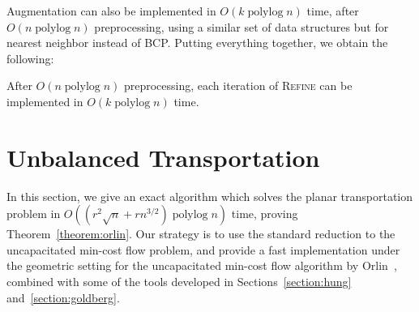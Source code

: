 \documentclass[a4paper,UKenglish]{socg-lipics-v2018}
\def\polylog{\mathop{\mathrm{polylog}}}
\def\norm#1{\mathopen\| #1 \mathclose\|}	%
\def\tsupply{\lambda}
\def\fsupply{\phi}
\def\arcto{\mathord\shortrightarrow}
\def\arc#1#2{#1\arcto#2}
\def\cost{\operatorname{cost}}
\theoremstyle{plain}
\numberwithin{figure}{section}
\begin{document}
Augmentation can also be implemented in $O(k\polylog n)$ time, after
$O(n\polylog n)$ preprocessing, using a similar set of data structures but
for nearest neighbor instead of BCP.
Putting everything together, we obtain the following:

\begin{lemma}
\label{lemma:refine_iter_time}
After $O(n\polylog n)$ preprocessing, each iteration of \textsc{Refine} can be
implemented in $O(k\polylog n)$ time.
\end{lemma}


\section{Unbalanced Transportation}
\label{section:orlin}

In this section, we give an exact algorithm which solves the planar transportation
problem in $O((r^2\sqrt{n} + rn^{3/2})\polylog n)$ time, proving Theorem~\ref{theorem:orlin}.
Our strategy is to use the standard reduction to the uncapacitated
min-cost flow problem, and provide a fast implementation under the geometric setting for the uncapacitated min-cost flow algorithm by Orlin~\cite{O93}, combined with some of the tools developed in Sections~\ref{section:hung} and~\ref{section:goldberg}.

\end{document}
